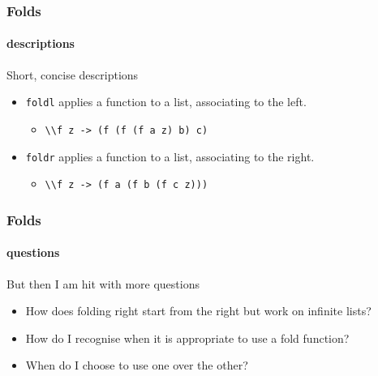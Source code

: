 \begin{frame}
\frametitle{Folds}
\framesubtitle{descriptions}

\begin{block}{Short, concise descriptions}

\begin{itemize}
\item \lstinline[basicstyle=\ttfamily]$foldl$ applies a function to a list, associating to the left.
\begin{itemize}
  \item \lstinline[basicstyle=\ttfamily]$\\f z -> (f (f (f a z) b) c)$
\end{itemize}
\item \lstinline[basicstyle=\ttfamily]$foldr$ applies a function to a list, associating to the right. 
\begin{itemize}
  \item \lstinline[basicstyle=\ttfamily]$\\f z -> (f a (f b (f c z)))$
\end{itemize}
\end{itemize}

\end{block}

\end{frame}


\begin{frame}
\frametitle{Folds}
\framesubtitle{questions}

\begin{block}{But then I am hit with more questions}

\begin{itemize}
\item How does folding right start from the right but work on infinite lists?
\item How do I recognise when it is appropriate to use a fold function?
\item When do I choose to use one over the other?
\end{itemize}

\end{block}

\end{frame}
